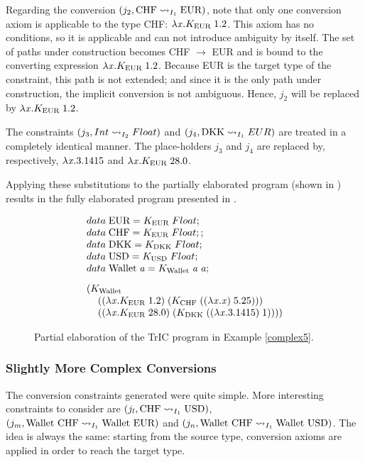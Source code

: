Regarding the conversion $(j_2,\convX{\imEnv_1}{\text{CHF}}{\text{EUR}})$, note that only one conversion axiom is applicable to the type CHF: $\lambda \tmVar . K_{\text{EUR}}\; 1.2$. This axiom has no conditions, so it is applicable and can not introduce ambiguity by itself. The set of paths under construction becomes CHF $\to$ EUR and is bound to the converting expression $\lambda \tmVar . K_{\text{EUR}}\; 1.2 $. Because EUR is the target type of the constraint, this path is not extended; and since it is the only path under construction, the implicit conversion is not ambiguous. Hence, $j_2$ will be replaced by $\lambda \tmVar . K_{\text{EUR}}\; 1.2 $.

The constraints $(j_3,\convX{\imEnv_2}{Int}{Float})$ and $(j_4,\convX{\imEnv_1}{\text{DKK}}{EUR})$ are treated in a completely identical manner. The place-holders $j_3$ and $j_4$ are replaced by, respectively, $\lambda \tmVar.3.1415$ and $\lambda \tmVar . K_{\text{EUR}}\; 28.0$.

Applying these substitutions to the partially elaborated program (shown in ) results in the fully elaborated program presented in .
\begin{figure}
     \[
\begin{array}{@{\hspace{0mm}}l@{\hspace{0mm}}}
  data\;\text{EUR}=K_{\text{EUR}}\;Float;\\
  data\;\text{CHF}=K_{\text{EUR}}\;Float;;\\
  data\;\text{DKK}=K_{\text{DKK}}\;Float;\\
  data\;\text{USD}=K_{\text{USD}}\;Float;\\
  data\;\text{Wallet}\;\tyVar=K_{\text{Wallet}}\; \tyVar \; \tyVar;\\[3mm]
  (K_{\text{Wallet}}\;\\\phantom{xx}((\lambda \tmVar . K_{\text{EUR}}\; 1.2)\;(K_{\text{CHF}}\;((\lambda \tmVar . \tmVar)\; 5.25)))\;\\\phantom{xx}((\lambda \tmVar . K_{\text{EUR}}\; 28.0)\; (K_{\text{DKK}}\;((\lambda \tmVar.3.1415)\;1))))

\end{array}
\]
\caption{Partial elaboration of the TrIC program in Example \ref{complex5}.}
\label{fullyElab}
\end{figure}

\subsubsection{Slightly More Complex Conversions}
The conversion constraints generated were quite simple. More interesting constraints to consider are $(j_l,\convX{\imEnv_1}{\text{CHF}}{\text{USD}})$, $(j_m,\convX{\imEnv_1}{\text{Wallet CHF}}{\text{Wallet EUR}})$ and $(j_n,\convX{\imEnv_1}{\text{Wallet CHF}}{\text{Wallet USD}})$. The idea is always the same: starting from the source type, conversion axioms are applied in order to reach the target type.

